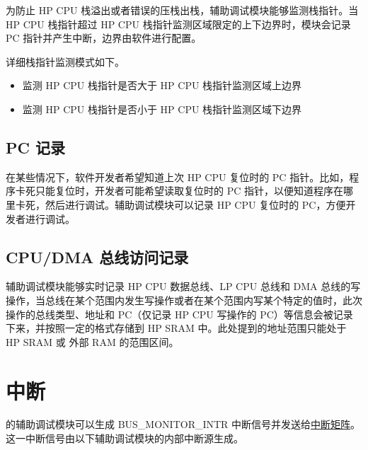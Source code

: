 \documentclass[main\_\_CN.tex]{subfiles}
\begin{document}
为防止 HP CPU 栈溢出或者错误的压栈出栈，辅助调试模块能够监测栈指针。当 HP CPU 栈指针超过 HP CPU 栈指针监测区域限定的上下边界时，模块会记录 PC 指针并产生中断，边界由软件进行配置。

详细栈指针监测模式如下。

\begin{itemize}
    \item 监测 HP CPU 栈指针是否大于 HP CPU 栈指针监测区域上边界
    \item 监测 HP CPU 栈指针是否小于 HP CPU 栈指针监测区域下边界
\end{itemize}

\subsection{PC 记录}

在某些情况下，软件开发者希望知道上次 HP CPU 复位时的 PC 指针。比如，程序卡死只能复位时，开发者可能希望读取复位时的 PC 指针，以便知道程序在哪里卡死，然后进行调试。辅助调试模块可以记录 HP CPU 复位时的 PC，方便开发者进行调试。

\subsection{CPU/DMA 总线访问记录}

辅助调试模块能够实时记录 HP CPU 数据总线、LP CPU 总线和 DMA 总线的写操作，当总线在某个范围内发生写操作或者在某个范围内写某个特定的值时，此次操作的总线类型、地址和 PC（仅记录 HP CPU 写操作的 PC）等信息会被记录下来，并按照一定的格式存储到 HP SRAM 中。此处提到的地址范围只能处于 HP SRAM 或 外部 RAM 的范围区间。



\section{中断}
\label{sec:dbgassist-interrupts}

\chipname{} 的辅助调试模块可以生成 BUS\_MONITOR\_INTR 中断信号并发送给\hyperref[mod:intmtrx]{中断矩阵}。这一中断信号由以下辅助调试模块的内部中断源生成。
\end{document}
